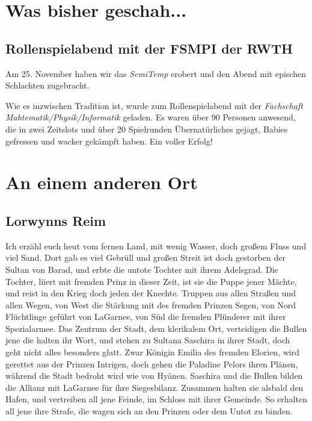 \documentclass[final]{multiversum}
\begin{document}
\makemultititle
%

\section{Was bisher geschah...}

\subsection{Rollenspielabend mit der FSMPI der RWTH}
Am 25. November haben wir das \textit{SemiTemp} erobert und den Abend mit epischen Schlachten zugebracht.

Wie es inzwischen Tradition ist, wurde zum Rollenspielabend mit der \textit{Fachschaft Mahtematik/Physik/Informatik} geladen.
Es waren über 90 Personen anwesend, die in zwei Zeitslots und über 20 Spielrunden Übernatürliches gejagt, Babies gefressen und wacker gekämpft haben.
Ein voller Erfolg!

\section{An einem anderen Ort}

\subsection{Lorwynns Reim}
Ich erzähl euch heut vom fernen Land, mit wenig Wasser, doch großem Fluss und viel Sand.
Dort gab es viel Gebrüll und großen Streit ist doch gestorben der Sultan von Barad, und erbte die untote Tochter mit ihrem Adelsgrad.
Die Tochter, liiert mit fremden Prinz in dieser Zeit, ist sie die Puppe jener Mächte, und reist in den Krieg doch jeden der Knechte.
Truppen aus allen Straßen und allen Wegen, von West die Stärkung mit des fremden Prinzen Segen, von Nord Flüchtlinge geführt von LaGarnee, von Süd die fremden Plünderer mit ihrer Spezialarmee.
Das Zentrum der Stadt, dem klerikalem Ort, verteidigen die Bullen jene die halten ihr Wort, und stehen zu Sultana Saschira in ihrer Stadt, doch geht nicht alles besonders glatt.
Zwar Königin Emilia des fremden Elorien, wird gerettet aus der Prinzen Intrigen, doch gehen die Paladine Pelors ihren Plänen, während die Stadt bedroht wird wie von Hyänen.
Saschira und die Bullen bilden die Allianz mit LaGarnee für ihre Siegesbilanz.
Zusammen halten sie alsbald den Hafen, und vertreiben all jene Feinde, im Schloss mit ihrer Gemeinde.
So erhalten all jene ihre Strafe, die wagen sich an den Prinzen oder dem Untot zu binden.
\end{document}
